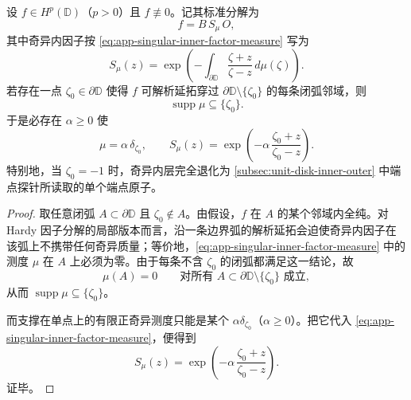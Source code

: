 \begin{theorem}[单端点解析延拓强制奇异内因子原子化]\label{thm:derived-hardy-single-endpoint-singular-inner-atom}
设 \(f\in H^p(\mathbb D)\)（\(p>0\)）且 \(f\not\equiv 0\)。记其标准分解为
\[
f=B\,S_\mu\,O,
\]
其中奇异内因子按 \eqref{eq:app-singular-inner-factor-measure} 写为
\[
S_\mu(z)=\exp\!\left(
-\int_{\partial\mathbb D}\frac{\zeta+z}{\zeta-z}\,d\mu(\zeta)
\right).
\]
若存在一点 \(\zeta_0\in\partial\mathbb D\) 使得 \(f\) 可解析延拓穿过 \(\partial\mathbb D\setminus\{\zeta_0\}\) 的每条闭弧邻域，则
\[
\operatorname{supp}\mu\subseteq\{\zeta_0\}.
\]
于是必存在 \(\alpha\ge 0\) 使
\[
\mu=\alpha\,\delta_{\zeta_0},
\qquad
S_\mu(z)=\exp\!\left(-\alpha\,\frac{\zeta_0+z}{\zeta_0-z}\right).
\]
特别地，当 \(\zeta_0=-1\) 时，奇异内层完全退化为 \ref{subsec:unit-disk-inner-outer} 中端点探针所读取的单个端点原子。
\end{theorem}
\begin{proof}
取任意闭弧 \(A\subset\partial\mathbb D\) 且 \(\zeta_0\notin A\)。由假设，\(f\) 在 \(A\) 的某个邻域内全纯。对 Hardy 因子分解的局部版本而言，沿一条边界弧的解析延拓会迫使奇异内因子在该弧上不携带任何奇异质量；等价地，\eqref{eq:app-singular-inner-factor-measure} 中的测度 \(\mu\) 在 \(A\) 上必须为零。由于每条不含 \(\zeta_0\) 的闭弧都满足这一结论，故
\[
\mu(A)=0
\qquad
\text{对所有 }A\subset\partial\mathbb D\setminus\{\zeta_0\}\text{ 成立},
\]
从而 \(\operatorname{supp}\mu\subseteq\{\zeta_0\}\)。

而支撑在单点上的有限正奇异测度只能是某个 \(\alpha\delta_{\zeta_0}\)（\(\alpha\ge 0\)）。把它代入 \eqref{eq:app-singular-inner-factor-measure}，便得到
\[
S_\mu(z)
=\exp\!\left(
-\alpha\,\frac{\zeta_0+z}{\zeta_0-z}
\right).
\]
证毕。
\end{proof}
